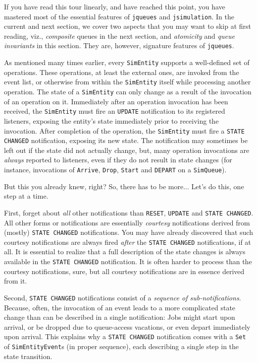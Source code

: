 If you have read this tour linearly,
  and have reached this point,
  you have mastered most of the essential features
  of \lstinline|jqueues| and \lstinline|jsimulation|.
In the current and next section,
  we cover two aspects that you may want to skip at first reading,
  viz., {\em composite\/} queues in the next section,
  and {\em atomicity\/} and {\em queue invariants\/} in this section.
They are, however, signature features of \lstinline|jqueues|.

As mentioned many times earlier,
  every \lstinline|SimEntity|
  supports a well-defined set of operations.
These operations, at least the external ones,
  are invoked from the event list,
  or otherwise from within the \lstinline|SimEntity| itself
  while processing another operation.
The state of a \lstinline|SimEntity| can only change
  as a result of the invocation of an operation on it.
Immediately after an operation invocation has been received,
  the \lstinline|SimEntity| must fire
  an \lstinline|UPDATE| notification to its registered
  listeners, exposing the entity's state
  immediately prior to receiving the invocation.
After completion of the operation,
  the \lstinline|SimEntity| must
  fire a \lstinline|STATE CHANGED| notification,
  exposing its new state.
The notification may sometimes be left out if the state
  did not actually change,
  but, many operation invocations are {\em always\/}
  reported to listeners, even if they do not result in state changes
  (for instance, invocations of \lstinline|Arrive|, \lstinline|Drop|,
   \lstinline|Start| and \lstinline|DEPART| on a \lstinline|SimQueue|).

But this you already knew, right? So, there has to be more...
Let's do this, one step at a time.

First, forget about {\em all\/} other notifications
  than \lstinline|RESET|, \lstinline|UPDATE| and \lstinline|STATE CHANGED|.
All other forms or notifications are essentially
  {\em courtesy\/} notifications derived from
  (mostly) \lstinline|STATE CHANGED| notifications.
You may have already discovered that such courtesy notifications
  are always fired {\em after\/} the \lstinline|STATE CHANGED|
  notifications, if at all.
It is essential to realize that a full description
  of the state changes is always available in the \lstinline|STATE CHANGED|
  notification.
It is often harder to process than the courtesy notifications, sure,
  but all courtesy notifications are in essence derived from it.

Second,
  \lstinline|STATE CHANGED| notifications
  consist of a {\em sequence of sub-notifications}.
Because, often,
  the invocation of an event leads to a more
  complicated state change than can be described
  in a single notification:
  Jobs might start upon arrival,
  or be dropped due to queue-access vacations,
  or even depart immediately upon arrival.
This explains why a \lstinline|STATE CHANGED|
  notification comes with a \lstinline|Set|
  of \lstinline|SimEntityEvent|s (in proper sequence),
  each describing a single step in the state transition.

